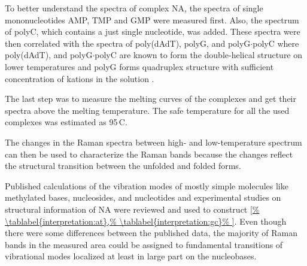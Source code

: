 \begin{table}
	\centering
	
	\caption*{
		(Continued, 3 of 4.)}
\end{table}

\begin{table}
	\centering
	
	\caption*{
		(Continued, 4 of 4.)}
\end{table}

To better understand the spectra of complex NA, the spectra of single
mononucleotides AMP, TMP and GMP were measured first.
Also, the spectrum of polyC, which contains a just single nucleotide, was
added.
These spectra were then correlated with the spectra of poly(dAdT), polyG, and
polyG$\cdot$polyC where poly(dAdT), and polyG$\cdot$polyC are known to form the
double-helical structure on lower temperatures
\parencite{Benevides2005}
and polyG forms quadruplex structure with sufficient concentration of kations
in
the solution
\parencite{Simard1994}.

The last step was to measure the melting curves of the complexes and get
their spectra above the melting temperature. The safe temperature for all the
used complexes was estimated as 95\,\textdegree{}C.

The changes in the Raman spectra between high- and low-temperature spectrum
can then be used to characterize the Raman bands because the changes
reflect the structural transition between the unfolded and folded forms.

Published calculations of the vibration modes of mostly simple molecules like
methylated bases, nucleosides, and nucleotides and experimental studies on
structural information of NA were reviewed and used to construct
\cref{%
	\tablabel{interpretation:at},%
	\tablabel{interpretation:gc}%
}.
Even though there were some differences between the published data, the
majority of Raman bands in the measured area could be assigned to fundamental
transitions of vibrational modes localized at least in large part on the
nucleobases.

